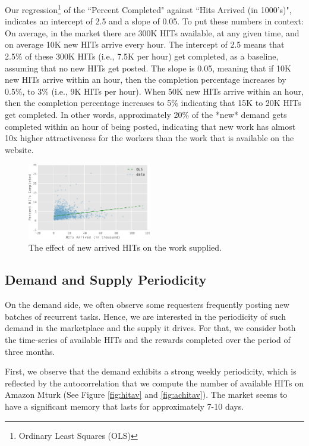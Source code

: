 Our regression\footnote{Ordinary Least Squares (OLS)} of the ``Percent Completed" against ``Hits Arrived (in
1000's)", indicates an intercept of 2.5 and a slope of 0.05. To put
these numbers in context: On average, in the market there are 300K
HITs available, at any given time, and on average 10K new HITs arrive
every hour. The intercept of 2.5 means that 2.5\% of these 300K HITs
(i.e., 7.5K per hour) get completed, as a baseline, assuming that no
new HITs get posted. The slope is 0.05, meaning that if 10K new HITs
arrive within an hour, then the completion percentage increases by
0.5\%, to 3\% (i.e., 9K HITs per hour). When 50K new HITs arrive within
an hour, then the completion percentage increases to 5\% indicating
that 15K to 20K HITs get completed. In other words, approximately 20\%
of the *new* demand gets completed within an hour of being posted,
indicating that new work has almost 10x higher attractiveness for the
workers than the work that is available on the website.

\begin{figure}[t!]
	\centering
	\includegraphics[width=0.48\textwidth]{figures/percent.pdf}
	\caption{The effect of new arrived HITs on the work  supplied.}
	\label{fig:perc_hits_completed}
\end{figure}

\subsection{Demand and Supply Periodicity}
On the demand side, we often observe some requesters frequently posting new batches of recurrent tasks. Hence, we are interested in the periodicity of such demand in the marketplace and the supply it drives. For that, we consider both the time-series of available HITs and the rewards completed over the period of three months. 

First, we observe that the demand exhibits a strong weekly periodicity, which is reflected by the autocorrelation that we compute the number of available HITs on Amazon Mturk (See Figure \ref{fig:hitav} and \ref{fig:achitav}). The market seems to have a significant memory that lasts for approximately 7-10 days.

